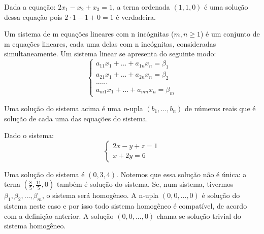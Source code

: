 \begin{ex}
	Dada a equação: $2x_{1}-x_{2}+x_{3}=1$, a terna ordenada $(1,1,0)$ é uma solução dessa equação pois $2\cdot1-1+0=1$ é verdadeira.
\end{ex}
\begin{df}
	Um sistema de m equações lineares com n incógnitas ($m,n\geqslant1$) é um conjunto de m equações lineares, cada uma delas com n incógnitas, consideradas simultaneamente. Um sistema linear se apresenta do seguinte modo:\\
	\begin{equation*}
	\begin{cases}
	a_{11}x_{1}+...+a_{1n}x_{n}=\beta_{1} \\
	a_{21}x_{1}+...+a_{2n}x_{n}=\beta_{2} \\
	......\\
	a_{m1}x_{1}+...+a_{mn}x_{n}=\beta_{m} 
	\end{cases}
	\end{equation*} 
	 
\end{df}
Uma solução do sistema acima é uma \textit{n}-upla $(b_{1},...,b_{n})$ de números reais que é solução de cada uma das equações do sistema.
\begin{ex}
	Dado o sistema:\\
	\begin{equation*}
	\begin{cases}
	2x-y+z=1 \\
    x+2y=6 
	\end{cases}
	\end{equation*}
\end{ex}
Uma solução do sistema é $(0,3,4)$. Notemos que essa solução não é única: a terna $(\frac{8}{5},\frac{11}{5},0)$ também é solução do sistema.
Se, num sistema, tivermos $\beta_{1},\beta_{2},...,\beta_{m}$, o sistema será homogêneo. A n-upla $(0,0,...,0)$ é solução do sistema neste caso e por isso todo sistema homogêneo é compatível, de acordo com a definição anterior. A solução $(0,0,...,0)$ chama-se solução trivial do sistema homogêneo. 

